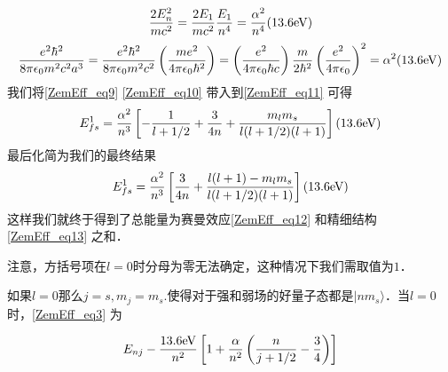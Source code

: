 \begin{equation}\label{ZemEff_eq10}
\frac{2E_n^2}{mc^2}=\frac{2E_1}{mc^2}\frac{E_1}{n^4}=\frac{\alpha^2}{n^4}(13.6\rm{eV})
\end{equation}
\begin{equation}
\frac{e^2\hbar^2}{8\pi\epsilon_0m^2c^2a^3}=\frac{e^2\hbar^2}{8\pi\epsilon_0m^2c^2}\left(\frac{me^2}{4\pi\epsilon_0\hbar^2}\right)=\left(\frac{e^2}{4\pi\epsilon_0\hbar c}\right)\frac{m}{2\hbar^2}\left(\frac{e^2}{4\pi\epsilon_0}\right)^2=\alpha^2(13.6\rm{eV})
\end{equation}
我们将\autoref{ZemEff_eq9} \autoref{ZemEff_eq10} 带入到\autoref{ZemEff_eq11} 可得
\begin{equation}\label{ZemEff_eq13}
E_{fs}^1=\frac{\alpha^2}{n^3}\left[-\frac{1}{l+1/2}+\frac{3}{4n}+\frac{m_lm_s}{l(l+1/2)(l+1)}\right](13.6 \rm eV) 
\end{equation}
最后化简为我们的最终结果
\begin{equation}
E_{fs}^1=\frac{\alpha^2}{n^3}\left[\frac{3}{4n}+\frac{l(l+1)-m_lm_s}{l(l+1/2)(l+1)}\right](13.6 \rm eV)
\end{equation}
这样我们就终于得到了总能量为赛曼效应\autoref{ZemEff_eq12} 和精细结构 \autoref{ZemEff_eq13} 之和．

注意，方括号项在$l=0$时分母为零无法确定，这种情况下我们需取值为$1$．
\begin{example}{}
如果$l=0$那么$j=s,m_j=m_s$.使得对于强和弱场的好量子态都是$|nm_s\rangle$．当$l=0$时，\autoref{ZemEff_eq3} 为

\begin{equation}
E_{nj}-\frac{13.6\rm{eV}}{n^2}\left[1+\frac{\alpha}{n^2}\left(\frac{n}{j+1/2}-\frac{3}{4}\right)\right]
\end{equation}

\end{example}

